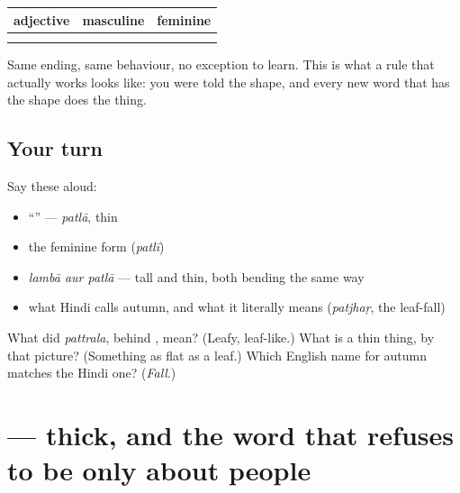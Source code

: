\begin{grammarlens}[title={Grammar Lens: the second of the three}]
\noindent
\begin{tabularx}{\linewidth}{@{}>{\raggedright\arraybackslash}X>{\raggedright\arraybackslash}X>{\raggedright\arraybackslash}X@{}}
\toprule
\textbf{adjective} & \textbf{masculine} & \textbf{feminine} \\
\midrule
\hi{लंबा} & \hi{लंबा} & \hi{लंबी} \\
\hi{पतला} & \hi{पतला} & \hi{पतली} \\
\bottomrule
\end{tabularx}

Same ending, same behaviour, no exception to learn. This is what a rule that actually works looks like: you were told the shape, and every new word that has the shape does the thing.
\end{grammarlens}

\subsection*{Your turn}
Say these aloud:

\begin{itemize}
\raggedright
  \item \textquotedblleft{}\textquotedblright{} — \emph{patlā}, thin
  \item the feminine form (\emph{patlī})
  \item \emph{lambā aur patlā} — tall and thin, both bending the same way
  \item what Hindi calls autumn, and what it literally means (\emph{patjhaṛ}, the leaf-fall)
\end{itemize}

\begin{tcolorbox}[breakable,colback=teal!4,colframe=teal!35!black,title={Before you move on}]
What did \emph{pattrala}, behind \textbf{}, mean? (Leafy, leaf-like.) What is a thin thing, by that picture? (Something as flat as a leaf.) Which English name for autumn matches the Hindi one? (\emph{Fall}.)
\end{tcolorbox}
\section[\texorpdfstring{\hi{मोटा} (moṭā)}{मोटा (moṭā)}]{ — thick, and the word that refuses to be only about people}

\label{lesson:HI-C82-motaa}




